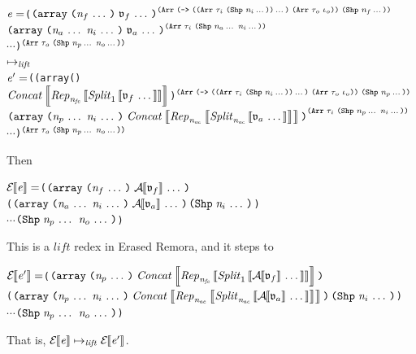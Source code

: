\begin{sproof}
{    {\,}}
\begin{alltt}
\(\expr = \)(\(\liftfn\)\\
\phantom{\(\expr = \) }\(\liftarg\)\\
\phantom{\(\expr = \) }\(\cdots\))\(\sp{\liftresultannot}\)\\
\(\mapsto\sb{\mathit{lift}}\)\\
\(\expr' = \)((array ()\\
\phantom{\(\expr' = \) \ }\(\liftedfncells\))\(\sp{\liftedfnannot}\)\\
\phantom{\(\expr' = \) }\(\liftedarg\)\\
\phantom{\(\expr' = \) }\(\cdots\))\(\sp{\liftresultannot}\)
\end{alltt}
Then
\begin{alltt}
\(\EraseE{\expr} = \)(\(\erasedliftfn\)\\
\phantom{\(\EraseE{\expr} = \) }(\(\erasedliftarg\) \(\erasedliftcell\))\\
\phantom{\(\EraseE{\expr} = \) }\(\cdots\) \(\erasedliftresult\))
\end{alltt}
This is a $\mathit{lift}$ redex in Erased Remora, and it steps to
\begin{alltt}
\(\EraseE{\expr'} = \)(\(\erasedliftedfn\)\\
(\(\erasedliftedarg\) \(\erasedliftcell\))\\
\(\cdots\) \(\erasedliftresult\))
\end{alltt}
That is, $\mathcal{E}{\hskip-.25em}\left\llbracket \mathit{e} \right\rrbracket \mapsto_{\mathit{lift}} \mathcal{E}{\hskip-.25em}\left\llbracket \mathit{e}' \right\rrbracket$.


\end{sproof}
